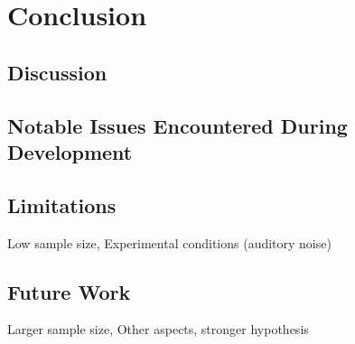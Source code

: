 \chapter{Conclusion}
\vspace{-1.6em}
%

\minitoc%
\thispagestyle{empty}
\newpage

\section{Discussion}

\section{Notable Issues Encountered During Development}

\section{Limitations}
Low sample size, Experimental conditions (auditory noise)

\section{Future Work}
Larger sample size, Other aspects, stronger hypothesis
